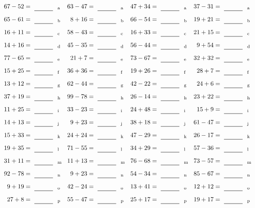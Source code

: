 \documentclass
[
  draft    = true,
  fontsize = 11pt,
  parskip  = half-
]
{scrartcl}
\begin{document}
\clearpage
\begin{align*}
    \pline{67-52}&=\rline{a}
  & \pline{63-47}&=\rline{a}
  & \pline{47+34}&=\rline{a}
  & \pline{37-31}&=\rline{a} \\[1ex]
    \pline{65-61}&=\rline{b}
  & \pline{8+16}&=\rline{b}
  & \pline{66-54}&=\rline{b}
  & \pline{19+21}&=\rline{b} \\[1ex]
    \pline{16+11}&=\rline{c}
  & \pline{58-43}&=\rline{c}
  & \pline{16+33}&=\rline{c}
  & \pline{21+15}&=\rline{c} \\[1ex]
    \pline{14+16}&=\rline{d}
  & \pline{45-35}&=\rline{d}
  & \pline{56-44}&=\rline{d}
  & \pline{9+54}&=\rline{d} \\[1ex]
    \pline{77-65}&=\rline{e}
  & \pline{21+7}&=\rline{e}
  & \pline{73-67}&=\rline{e}
  & \pline{32+32}&=\rline{e} \\[1ex]
    \pline{15+25}&=\rline{f}
  & \pline{36+36}&=\rline{f}
  & \pline{19+26}&=\rline{f}
  & \pline{28+7}&=\rline{f} \\[1ex]
    \pline{13+12}&=\rline{g}
  & \pline{62-44}&=\rline{g}
  & \pline{42-22}&=\rline{g}
  & \pline{24+6}&=\rline{g} \\[1ex]
    \pline{37+19}&=\rline{h}
  & \pline{99-78}&=\rline{h}
  & \pline{26-14}&=\rline{h}
  & \pline{23+22}&=\rline{h} \\[1ex]
    \pline{11+25}&=\rline{i}
  & \pline{33-23}&=\rline{i}
  & \pline{24+48}&=\rline{i}
  & \pline{15+9}&=\rline{i} \\[1ex]
    \pline{14+13}&=\rline{j}
  & \pline{9+23}&=\rline{j}
  & \pline{38+18}&=\rline{j}
  & \pline{61-47}&=\rline{j} \\[1ex]
    \pline{15+33}&=\rline{k}
  & \pline{24+24}&=\rline{k}
  & \pline{47-29}&=\rline{k}
  & \pline{26-17}&=\rline{k} \\[1ex]
    \pline{19+35}&=\rline{l}
  & \pline{71-55}&=\rline{l}
  & \pline{34+29}&=\rline{l}
  & \pline{57-36}&=\rline{l} \\[1ex]
    \pline{31+11}&=\rline{m}
  & \pline{11+13}&=\rline{m}
  & \pline{76-68}&=\rline{m}
  & \pline{73-57}&=\rline{m} \\[1ex]
    \pline{92-78}&=\rline{n}
  & \pline{9+23}&=\rline{n}
  & \pline{54-34}&=\rline{n}
  & \pline{85-67}&=\rline{n} \\[1ex]
    \pline{9+19}&=\rline{o}
  & \pline{42-24}&=\rline{o}
  & \pline{13+41}&=\rline{o}
  & \pline{12+12}&=\rline{o} \\[1ex]
    \pline{27+8}&=\rline{p}
  & \pline{55-47}&=\rline{p}
  & \pline{25+17}&=\rline{p}
  & \pline{19+17}&=\rline{p}
\end{align*}
\end{document}

